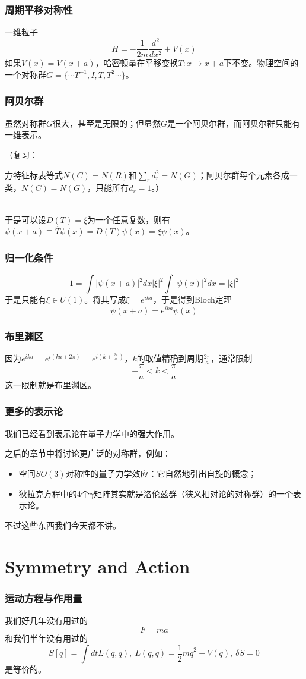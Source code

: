 \documentclass[CJK]{beamer}
\begin{document}
\begin{frame}
\frametitle{\bch 周期平移对称性\ech}
\bch
一维粒子
$$
H = -\frac{1}{2m} \frac{d^2}{dx^2} + V(x)
$$
如果$V(x) = V(x+a)$，哈密顿量在平移变换$T : x \to x+a$下不变。物理空间的一个对称群$G = \{ \cdots T^{-1} , I, T , T^2 \cdots\}$。
\ech
\end{frame}


\begin{frame}
\frametitle{\bch 阿贝尔群\ech}
\bch
虽然对称群$G$很大，甚至是无限的；但显然$G$是一个阿贝尔群，而阿贝尔群只能有一维表示。
\par
（复习：
\par
方特征标表等式$N(C) = N(R)$和$\sum_r d_r^2 = N(G)$；阿贝尔群每个元素各成一类，$N(C) = N(G)$，只能所有$d_r = 1$。）
\\  \ \\
\par
于是可以设$D(T) = \xi$为一个任意复数，则有$\psi(x+a) \equiv \hat T \psi(x) = D(T) \psi(x) = \xi \psi(x)$。
\ech
\end{frame}

\begin{frame}
\frametitle{\bch 归一化条件 \ech}
\bch
$$1 = \int |\psi(x+a) |^2 dx  |\xi|^2 \int |\psi(x)|^2 dx = |\xi|^2$$
于是只能有$\xi \in U(1)$。将其写成$\xi = e^{ika}$，于是得到Bloch定理
$$
\psi(x+a) = e^{ika} \psi(x)
$$
\ech
\end{frame}

\begin{frame}
\frametitle{\bch 布里渊区 \ech}
\bch
因为$e^{ika} = e^{i(ka + 2\pi)} = e^{i(k + \frac{2\pi}{a} )}$，$k$的取值精确到周期$\frac{2\pi}{a}$，通常限制$$-\frac{\pi}{a} < k < \frac{\pi}{a}$$
这一限制就是布里渊区。
\ech
\end{frame}

\begin{frame}
\frametitle{\bch 更多的表示论 \ech}
\bch
我们已经看到表示论在量子力学中的强大作用。
\par
之后的章节中将讨论更广泛的对称群，例如：
\begin{itemize}
\item 空间$SO(3)$对称性的量子力学效应：它自然地引出自旋的概念；
\item 狄拉克方程中的4个$\gamma$矩阵其实就是洛伦兹群（狭义相对论的对称群）的一个表示论。
\end{itemize}
\par
不过这些东西我们今天都不讲。
\ech
\end{frame}

\section{Symmetry and Action}
\begin{frame}
\frametitle{\bch 运动方程与作用量 \ech}
\bch
我们好几年没有用过的
$$F = ma$$
和我们半年没有用过的
$$
S[q] = \int dt L(q,\dot{q}) ,\ L(q,\dot{q}) = \frac{1}{2}m\dot{q}^2 - V(q),\ \delta S = 0
$$
是等价的。
\ech
\end{frame}
\end{document}
